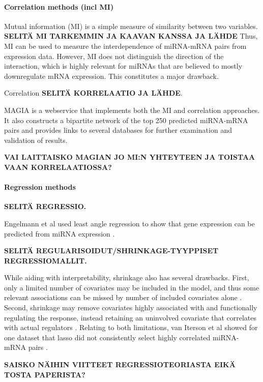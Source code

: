 \paragraph{Correlation methods (incl MI)}\label{correlation-methods}

Mutual information (MI) is a simple measure of similarity between two
variables. \textbf{SELITÄ MI TARKEMMIN JA KAAVAN KANSSA JA LÄHDE} Thus, MI can
be used to measure the interdependence of miRNA-mRNA pairs from expression
data. However, MI does not distinguish the direction of the interaction, which
is highly relevant for miRNAs that are believed to mostly downregulate mRNA
expression. This constitutes a major drawback.

Correlation \textbf{SELITÄ KORRELAATIO JA LÄHDE}.

MAGIA \citep{Sales2010} is a webservice that implements both the MI and
correlation approaches. It also constructs a bipartite network of the top 250
predicted miRNA-mRNA pairs and provides links to several databases for further
examination and validation of results.

\textbf{VAI LAITTAISKO MAGIAN JO MI:N YHTEYTEEN JA TOISTAA VAAN
KORRELAATIOSSA?}



\paragraph{Regression methods}\label{regression-methods}

\textbf{SELITÄ REGRESSIO.}

Engelmann et al used least angle regression to show that gene expression can
be predicted from miRNA expression \citep{Engelmann}.

\textbf{SELITÄ REGULARISOIDUT/SHRINKAGE-TYYPPISET REGRESSIOMALLIT.}

While aiding with interpretability, shrinkage also has several drawbacks.
First, only a limited number of covariates may be included in the model, and
thus some relevant associations can be missed by number of included covariates
alone \citep{vanIterson2013}. Second, shrinkage may remove covariates highly
associated with and functionally regulating the response, instead retaining an
uninvolved covariate that correlates with actual regulators \citep{Engelmann}.
Relating to both limitations, van Iterson et al showed for one dataset that
lasso did not consistently select highly correlated miRNA-mRNA pairs
\citep{vanIterson2013}.

\textbf{SAISKO NÄIHIN VIITTEET REGRESSIOTEORIASTA EIKÄ TOSTA PAPERISTA?}



